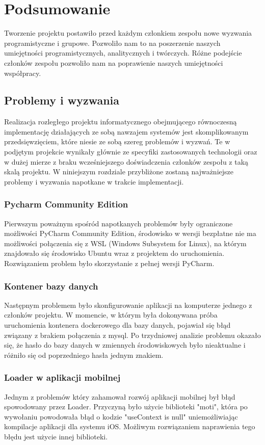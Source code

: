 \chapter{Podsumowanie}

Tworzenie projektu postawiło przed każdym członkiem zespołu nowe wyzwania programistyczne i grupowe. Pozwoliło nam to na poszerzenie naszych umiejętności programistycznych, analitycznych i twórczych. Różne podejście członków zespołu pozwoliło nam na poprawienie naszych umiejętności współpracy.

\section{Problemy i wyzwania}
Realizacja rozległego projektu informatycznego obejmującego równoczesną implementację działających ze sobą nawzajem systemów jest skomplikowanym przedsięwzięciem, które niesie ze sobą szereg problemów i wyzwań. Te w podjętym projekcie wynikały głównie ze specyfiki zastosowanych technologii oraz w dużej mierze z braku wcześniejszego doświadczenia członków zespołu z taką skalą projektu. W niniejszym rozdziale przybliżone zostaną najważniejsze problemy i wyzwania napotkane w trakcie implementacji.

\subsection{Pycharm Community Edition}
Pierwszym poważnym spośród napotkanych problemów były ograniczone możliwości PyCharm Community Edition, środowisko w wersji bezpłatne nie ma możliwości połączenia się z WSL (Windows Subsystem for Linux), na którym znajdowało się środowisko Ubuntu wraz z projektem do uruchomienia. Rozwiązaniem problem było skorzystanie z pełnej wersji PyCharm.

\subsection{Kontener bazy danych}
Następnym problemem było skonfigurowanie aplikacji na komputerze jednego z członków projektu. W momencie, w którym była dokonywana próba uruchomienia kontenera dockerowego dla bazy danych, pojawiał się błąd związany z brakiem połączenia z mysql. Po trzydniowej analizie problemu okazało się, że hasło do bazy danych w zmiennych środowiskowych było nieaktualne i różniło się od poprzedniego hasła jednym znakiem.

\subsection{Loader w aplikacji mobilnej}
Jednym z problemów który zahamował rozwój aplikacji mobilnej był błąd spowodowany przez Loader. Przyczyną było użycie biblioteki "moti", która po wywołaniu powodowała błąd o kodzie "useContext is null" uniemożliwiając kompilacje aplikacji dla systemu iOS. Możliwym rozwiązaniem naprawienia tego błędu jest użycie innej biblioteki.

